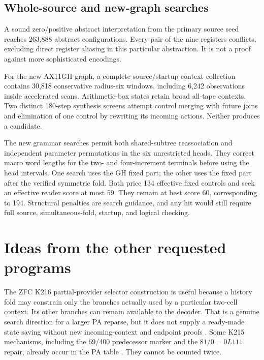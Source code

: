 \documentclass[10pt,letterpaper]{article}
\begin{document}
\subsection{Whole-source and new-graph searches}

A sound zero/positive abstract interpretation from the primary source
seed reaches 263,888 abstract configurations. Every pair of the nine
registers conflicts, excluding direct register aliasing in this particular
abstraction. It is not a proof against more sophisticated encodings.

For the new AX11GH graph, a complete source/startup context collection
contains 30,818 conservative radius-six windows, including 6,242
observations inside accelerated scans. Arithmetic-box states retain
broad all-tape contexts. Two distinct 180-step synthesis screens attempt
control merging with future joins and elimination of one control by
rewriting its incoming actions. Neither produces a candidate.

The new grammar searches permit both shared-subtree reassociation and
independent parameter permutations in the six unrestricted heads.
They correct macro word lengths for the two- and four-increment
terminals before using the head intervals. One search uses the GH fixed
part; the other uses the fixed part after the verified symmetric fold.
Both price 134 effective fixed controls and seek an effective reader
score at most 59. They remain at best score 60, corresponding to 194.
Structural penalties are search guidance, and any hit would still require
full source, simultaneous-fold, startup, and logical checking.



\section{Ideas from the other requested programs}

The ZFC K216 partial-provider selector construction is useful because a
history fold may constrain only the branches actually used by a particular
two-cell context. Its other branches can remain available to the decoder.
That is a genuine search direction for a larger PA reparse, but it does
not supply a ready-made state saving without new incoming-context and
endpoint proofs \cite{zfc216}. Some K215 mechanisms, including the
69/400 predecessor marker and the $81/0=0L111$ repair, already occur in
the PA table \cite{zfc215}. They cannot be counted twice.
\end{document}
